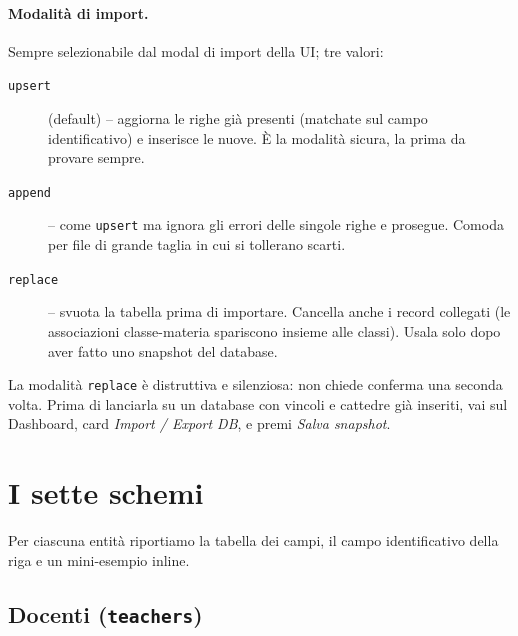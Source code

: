\paragraph{Modalit\`a di import.} Sempre selezionabile dal modal
di import della UI; tre valori:

\begin{description}
\item[\texttt{upsert}] (default) -- aggiorna le righe gi\`a presenti
  (matchate sul campo identificativo) e inserisce le nuove. \`E
  la modalit\`a sicura, la prima da provare sempre.
\item[\texttt{append}] -- come \texttt{upsert} ma ignora gli
  errori delle singole righe e prosegue. Comoda per file di grande
  taglia in cui si tollerano scarti.
\item[\texttt{replace}] -- svuota la tabella prima di importare.
  Cancella anche i record collegati (le associazioni
  classe-materia spariscono insieme alle classi). Usala solo dopo
  aver fatto uno snapshot del database.
\end{description}

\begin{avvertenzabox}
La modalit\`a \texttt{replace} \`e distruttiva e silenziosa: non
chiede conferma una seconda volta. Prima di lanciarla su un
database con vincoli e cattedre gi\`a inseriti, vai sul
Dashboard, card \emph{Import / Export DB}, e premi \emph{Salva
snapshot}.
\end{avvertenzabox}

\section{I sette schemi}
\label{sec:formato_schemi}

Per ciascuna entit\`a riportiamo la tabella dei campi, il campo
identificativo della riga e un mini-esempio inline.

\subsection{Docenti (\texttt{teachers})}

